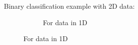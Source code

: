\begin{frame}

Binary classification example with 2D data:

\begin{figure}[ht]
     \centering
     \begin{subfigure}[t]{0.37\textwidth}
         \centering
         \usebox{\imagebox}%
         \caption{For data in 1D}
         \label{fig:quadratic}
     \end{subfigure}
     \hspace{2mm}
\end{figure}



\end{frame}

